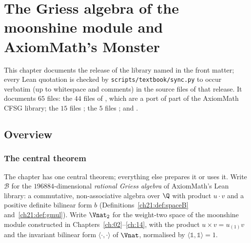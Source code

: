 \chapter{The Griess algebra of the moonshine module and AxiomMath's Monster}\label{ch:21}

\providecommand{\chXXIB}{\mathcal{B}}
\providecommand{\chXXIC}{\mathcal{C}}
\providecommand{\chXXIS}{\mathcal{S}}
\providecommand{\chXXIL}{\bar{\Lambda}}
\providecommand{\chXXIF}{\mathbb{F}_2}
\providecommand{\chXXISym}{\mathrm{Sym}}
\providecommand{\chXXIT}{\mathcal{T}}

This chapter documents the release of the library named in the front matter; every Lean quotation is checked by
\texttt{scripts/textbook/sync.py} to occur verbatim (up to whitespace and comments) in the source files
of that release.  It documents $65$ files:
the $44$ files of , which are a port of
part of the AxiomMath CFSG library; the $15$ files
; the $5$ files
; and
.

\section{Overview}\label{ch21:sec:intro}

\subsection{The central theorem}

The chapter has one central theorem; everything else prepares it or uses it.  Write $\chXXIB$ for the
$196884$-dimensional \emph{rational Griess algebra} of AxiomMath's Lean library: a commutative,
non-associative algebra over $\Q$ with product $u\cdot v$ and a positive definite bilinear form $b$
(Definitions~\ref{ch21:def:spaceB} and~\ref{ch21:def:gmul}).  Write $\Vnat_2$ for the weight-two space of
the moonshine module constructed in Chapters~\ref{ch:02}--\ref{ch:14}, with the product
$u\times v=u_{(1)}v$ and the invariant bilinear form $\langle\cdot,\cdot\rangle$ of $\Vnat$, normalised by
$\langle\mathbb1,\mathbb1\rangle=1$.

